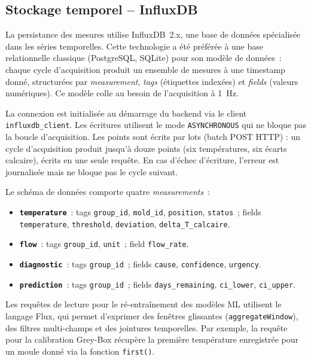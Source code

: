 \subsection{Stockage temporel -- InfluxDB}

La persistance des mesures utilise InfluxDB~2.x, une base de données spécialisée dans les séries temporelles. Cette technologie a été préférée à une base relationnelle classique (PostgreSQL, SQLite) pour son modèle de données~: chaque cycle d'acquisition produit un ensemble de mesures à une timestamp donné, structurées par \emph{measurement}, \emph{tags} (étiquettes indexées) et \emph{fields} (valeurs numériques). Ce modèle colle au besoin de l'acquisition à 1~Hz.

La connexion est initialisée au démarrage du backend via le client \texttt{influxdb\_client}. Les écritures utilisent le mode \texttt{ASYNCHRONOUS} qui ne bloque pas la boucle d'acquisition. Les points sont écrits par lots (batch POST HTTP) : un cycle d'acquisition produit jusqu'à douze points (six températures, six écarts calcaire), écrits en une seule requête. En cas d'échec d'écriture, l'erreur est journalisée mais ne bloque pas le cycle suivant.

Le schéma de données comporte quatre \emph{measurements}~:

\begin{itemize}
  \item \textbf{\texttt{temperature}}~: tags \texttt{group\_id}, \texttt{mold\_id}, \texttt{position}, \texttt{status}~; fields \texttt{temperature}, \texttt{threshold}, \texttt{deviation}, \texttt{delta\_T\_calcaire}.
  \item \textbf{\texttt{flow}}~: tags \texttt{group\_id}, \texttt{unit}~; field \texttt{flow\_rate}.
  \item \textbf{\texttt{diagnostic}}~: tags \texttt{group\_id}~; fields \texttt{cause}, \texttt{confidence}, \texttt{urgency}.
  \item \textbf{\texttt{prediction}}~: tags \texttt{group\_id}~; fields \texttt{days\_remaining}, \texttt{ci\_lower}, \texttt{ci\_upper}.
\end{itemize}

Les requêtes de lecture pour le ré-entraînement des modèles ML utilisent le langage Flux, qui permet d'exprimer des fenêtres glissantes (\texttt{aggregateWindow}), des filtres multi-champs et des jointures temporelles. Par exemple, la requête pour la calibration Grey-Box récupère la première température enregistrée pour un moule donné via la fonction \texttt{first()}.

